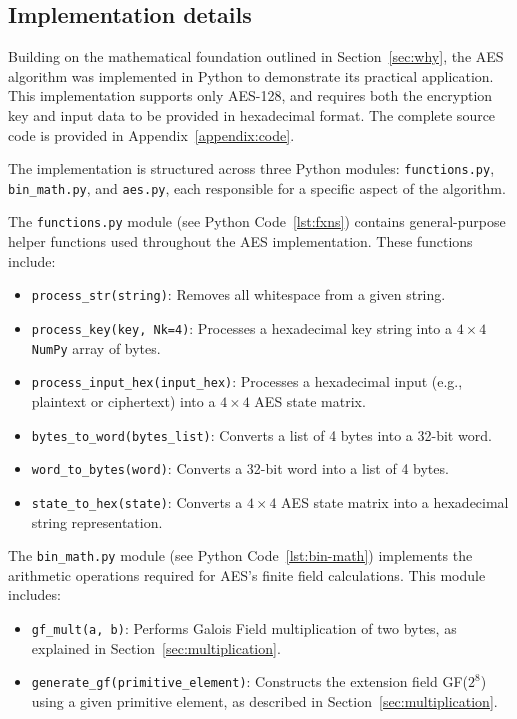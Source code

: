 \subsection{Implementation details}

Building on the mathematical foundation outlined in Section~\ref{sec:why}, the AES algorithm was implemented in Python to demonstrate its practical application.
This implementation supports only AES-128, and requires both the encryption key and input data to be provided in hexadecimal format. 
The complete source code is provided in Appendix~\ref{appendix:code}.

The implementation is structured across three Python modules: \texttt{functions.py}, \texttt{bin\_math.py}, and \texttt{aes.py}, each responsible for a specific aspect of the algorithm.

The \texttt{functions.py} module (see Python Code~\ref{lst:fxns}) contains general-purpose helper functions used throughout the AES implementation. 
These functions include:
\begin{itemize}
    \item \texttt{process\_str(string)}: Removes all whitespace from a given string.
    \item \texttt{process\_key(key, Nk=4)}: Processes a hexadecimal key string into a $4\times4$ \texttt{NumPy} array of bytes.
    \item \texttt{process\_input\_hex(input\_hex)}: Processes a hexadecimal input (e.g., plaintext or ciphertext) into a $4\times4$ AES state matrix.
    \item \texttt{bytes\_to\_word(bytes\_list)}: Converts a list of 4 bytes into a 32-bit word.
    \item \texttt{word\_to\_bytes(word)}: Converts a 32-bit word into a list of 4 bytes.
    \item \texttt{state\_to\_hex(state)}: Converts a $4\times4$ AES state matrix into a hexadecimal string representation.
\end{itemize}

The \texttt{bin\_math.py} module (see Python Code~\ref{lst:bin-math}) implements the arithmetic operations required for AES's finite field calculations. 
This module includes:
\begin{itemize}
    \item \texttt{gf\_mult(a, b)}: Performs Galois Field multiplication of two bytes, as explained in Section~\ref{sec:multiplication}.
    \item \texttt{generate\_gf(primitive\_element)}: Constructs the extension field GF($2^8$) using a given primitive element, as described in Section~\ref{sec:multiplication}.
\end{itemize}

